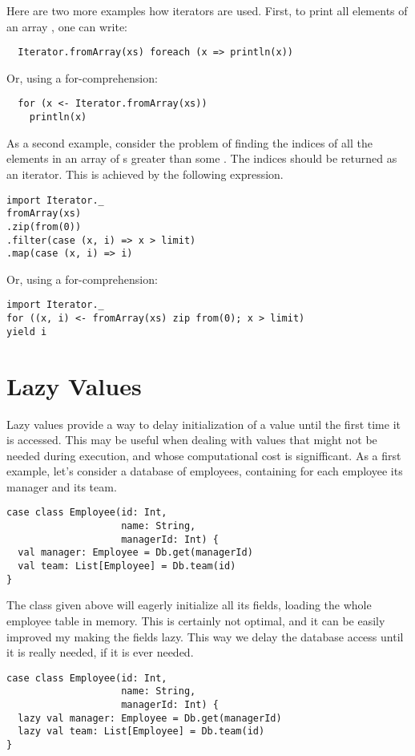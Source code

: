 {Here are two more examples how iterators are used. First, to print all
elements of an array , one can write:
\begin{lstlisting}
  Iterator.fromArray(xs) foreach (x => println(x))
\end{lstlisting}
Or, using a for-comprehension:
\begin{lstlisting}
  for (x <- Iterator.fromArray(xs))
    println(x)
\end{lstlisting}
As a second example, consider the problem of finding the indices of
all the elements in an array of s greater than some
. The indices should be returned as an iterator.
This is achieved by the following expression.
\begin{lstlisting}
import Iterator._
fromArray(xs)
.zip(from(0))
.filter(case (x, i) => x > limit)
.map(case (x, i) => i)
\end{lstlisting}
Or, using a for-comprehension:
\begin{lstlisting}
import Iterator._
for ((x, i) <- fromArray(xs) zip from(0); x > limit)
yield i
\end{lstlisting}

\chapter{Lazy Values}

Lazy values provide a way to delay initialization of a value until the
first time it is accessed. This may be useful when dealing with
values that might not be needed during execution, and whose
computational cost is signifficant. As a first example, let's consider
a database of employees, containing for each employee its manager and
its team.
\begin{lstlisting}
case class Employee(id: Int, 
                    name: String, 
                    managerId: Int) {
  val manager: Employee = Db.get(managerId)
  val team: List[Employee] = Db.team(id)
}
\end{lstlisting}

The \lstinline@Employee@ class given above will eagerly initialize
all its fields, loading the whole employee table in memory. This is
certainly not optimal, and it can be easily  improved my making the
fields lazy. This way we delay the database access until it is really
needed, if it is ever needed.
\begin{lstlisting}
case class Employee(id: Int, 
                    name: String, 
                    managerId: Int) {
  lazy val manager: Employee = Db.get(managerId)
  lazy val team: List[Employee] = Db.team(id)
}
\end{lstlisting}

}
